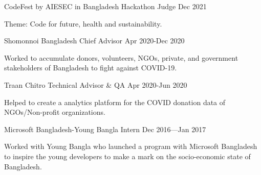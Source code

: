 

\begin{cventries}

  \cventry
    {CodeFest by AIESEC in Bangladesh} %
    {Hackathon Judge} %
    {} %
    {Dec 2021} %
    {
      \begin{cvitems} %
        \item {Theme: Code for future, health and sustainability.}
      \end{cvitems}}

  \cventry
    {Shomonnoi Bangladesh}
    {Chief Advisor}
    {}
    {Apr 2020-Dec 2020}
    {
      \begin{cvitems} %
        \item {Worked to accumulate donors, volunteers, NGOs, private, and government stakeholders of Bangladesh to fight against COVID-19.}
      \end{cvitems}
    }
    
  \cventry
    {Traan Chitro}
    {Technical Advisor \& QA}
    {}
    {Apr 2020-Jun 2020}
    {
      \begin{cvitems} %
        \item {Helped to create a analytics platform for the COVID donation data of NGOs/Non-profit organizations.}
      \end{cvitems}
    }
    
  \cventry 
    {Microsoft Bangladesh-Young Bangla}
    {Intern}
    {}
    {Dec 2016—Jan 2017}
    {
      \begin{cvitems} %
        \item {Worked with Young Bangla who launched a program with Microsoft Bangladesh to inspire the young developers to make a mark on the socio-economic state of Bangladesh.}
      \end{cvitems}
    }
    

\end{cventries}
